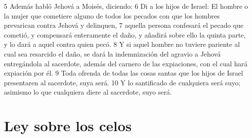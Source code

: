 5 Además habló Jehová a Moisés, diciendo:
6 Di a los hijos de Israel: El hombre o la mujer que cometiere alguno de todos los pecados con que los hombres prevarican contra Jehová y delinquen,
7 aquella persona confesará el pecado que cometió, y compensará enteramente el daño, y añadirá sobre ello la quinta parte, y lo dará a aquel contra quien pecó.
8 Y si aquel hombre no tuviere pariente al cual sea resarcido el daño, se dará la indemnización del agravio a Jehová entregándola al sacerdote, además del carnero de las expiaciones, con el cual hará expiación por él. 
9 Toda ofrenda de todas las cosas santas que los hijos de Israel presentaren al sacerdote, suya será.
10 Y lo santificado de cualquiera será suyo; asimismo lo que cualquiera diere al sacerdote, suyo será.
\section*{Ley sobre los celos}

